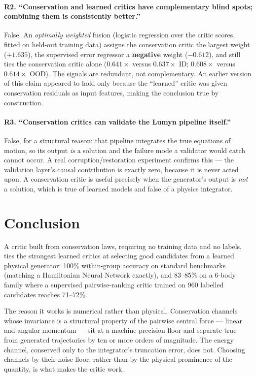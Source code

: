\documentclass[11pt]{article}
\begin{document}
\paragraph{R2. ``Conservation and learned critics have complementary blind spots;
combining them is consistently better.''} False. An \emph{optimally weighted} fusion
(logistic regression over the critic scores, fitted on held-out training data) assigns
the conservation critic the largest weight ($+1.635$), the supervised error regressor a
\textbf{negative} weight ($-0.612$), and still ties the conservation critic alone
($0.641\times$ versus $0.637\times$ ID; $0.608\times$ versus $0.614\times$ OOD). The
signals are redundant, not complementary. An earlier version of this claim appeared to
hold only because the ``learned'' critic was given conservation residuals as input
features, making the conclusion true by construction.

\paragraph{R3. ``Conservation critics can validate the Lumyn pipeline itself.''} False,
for a structural reason: that pipeline integrates the true equations of motion, so its
output \emph{is} a solution and the failure mode a validator would catch cannot occur. A
real corruption/restoration experiment confirms this --- the validation layer's causal
contribution is exactly zero, because it is never acted upon. A conservation critic is
useful precisely when the generator's output is \emph{not} a solution, which is true of
learned models and false of a physics integrator.

\section{Conclusion}

A critic built from conservation laws, requiring no training data and no labels, ties
the strongest learned critics at selecting good candidates from a learned physical
generator: 100\% within-group accuracy on standard benchmarks (matching a Hamiltonian
Neural Network exactly), and 83--85\% on a 6-body family where a supervised
pairwise-ranking critic trained on 960 labelled candidates reaches 71--72\%.

The reason it works is numerical rather than physical. Conservation channels whose
invariance is a structural property of the pairwise central force --- linear and angular
momentum --- sit at a machine-precision floor and separate true from generated
trajectories by ten or more orders of magnitude. The energy channel, conserved only to
the integrator's truncation error, does not. Choosing channels by their noise floor,
rather than by the physical prominence of the quantity, is what makes the critic work.
\end{document}
